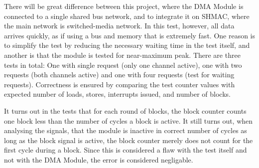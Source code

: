 \begin{appendix}
\begin{description}
    There will be great difference between this project, where the DMA Module is connected to a single shared bus network, and to integrate it on SHMAC, where the main network is switched-media network.
    In this test, however, all data arrives quickly, as if using a bus and memory that is extremely fast.
    One reason is to simplify the test by reducing the necessary waiting time in the test itself, and another is that the module is tested for near-maximum peak.
    There are three tests in total: One with single request (only one channel active), one with two requests (both channels active) and one with four requests (test for waiting requests).
    Correctness is ensured by comparing the test counter values with expected number of loads, stores, interrupts issued, and number of blocks.
    
    It turns out in the tests that for each round of blocks, the block counter counts one block less than the number of cycles a block is active. It still turns out, when analysing the signals, that the module is inactive in correct number of cycles as long as the block signal is active, the block counter merely does not count for the first cycle during a block. Since this is considered a flaw with the test itself and not with the DMA Module, the error is considered negligable. 
\end{description}


\end{appendix}

